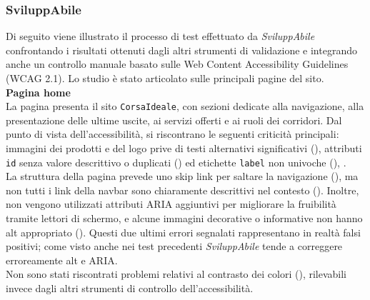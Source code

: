 \subsubsection{SviluppAbile}
\noindent Di seguito viene illustrato il processo di test effettuato da \textit{SviluppAbile} confrontando i risultati ottenuti dagli altri strumenti di validazione e integrando anche un controllo manuale basato sulle Web Content Accessibility Guidelines (WCAG 2.1). Lo studio è stato articolato sulle principali pagine del sito.\\

\noindent \textbf{Pagina home}\\
La pagina presenta il sito \texttt{CorsaIdeale}, con sezioni dedicate alla navigazione, alla presentazione delle ultime uscite, ai servizi offerti e ai ruoli dei corridori. Dal punto di vista dell’accessibilità, si riscontrano le seguenti criticità principali: immagini dei prodotti e del logo prive di testi alternativi significativi ({}), attributi \texttt{id} senza valore descrittivo o duplicati ({}) ed etichette \texttt{label} non univoche ({}), .\\
La struttura della pagina prevede uno skip link per saltare la navigazione ({}), ma non tutti i link della navbar sono chiaramente descrittivi nel contesto ({}). Inoltre, non vengono utilizzati attributi ARIA aggiuntivi per migliorare la fruibilità tramite lettori di schermo, e alcune immagini decorative o informative non hanno alt appropriato ({}). Questi due ultimi errori segnalati rappresentano in realtà falsi positivi; come visto anche nei test precedenti \textit{SviluppAbile} tende a correggere erroreamente alt e ARIA.\\
Non sono stati riscontrati problemi relativi al contrasto dei colori ({}), rilevabili invece dagli altri strumenti di controllo dell'accessibilità.\\

